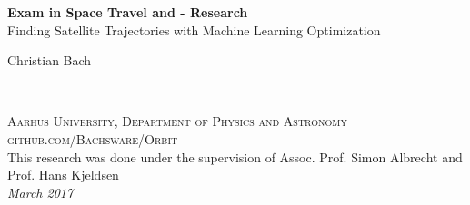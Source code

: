\documentclass[11pt,fleqn]{book} %
\begin{document}

\begingroup
\thispagestyle{empty}
\centering
\vspace*{5cm}
\par\normalfont\fontsize{35}{35}\sffamily\selectfont
\textbf{Exam in Space Travel and - Research}\\
{\LARGE Finding Satellite Trajectories with Machine Learning Optimization}\par %
\vspace*{1cm}
{\Huge Christian Bach}\par %
\endgroup


\newpage
~\vfill
\thispagestyle{empty}


\noindent \textsc{Aarhus University, Department of Physics and Astronomy}\\

\noindent \textsc{github.com/Bachsware/Orbit}\\ %

\noindent This research was done under the supervision of Assoc. Prof. Simon Albrecht and Prof. Hans Kjeldsen\\ %

\noindent \textit{March 2017} %



\pagestyle{empty} %

\tableofcontents %


\pagestyle{fancy} %



	
	
	

	
	 
	 \printbibliography
\end{document}
